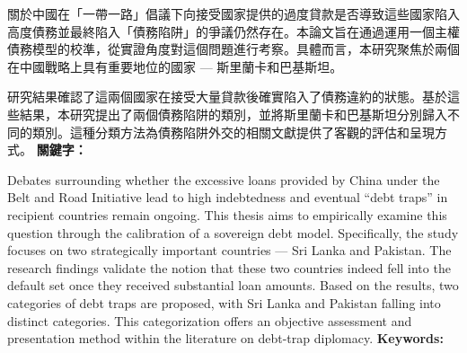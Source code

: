 \begin{abstractzh}
關於中國在「一帶一路」倡議下向接受國家提供的過度貸款是否導致這些國家陷入高度債務並最終陷入「債務陷阱」的爭議仍然存在。本論文旨在通過運用一個主權債務模型的校準，從實證角度對這個問題進行考察。具體而言，本研究聚焦於兩個在中國戰略上具有重要地位的國家 --- 斯里蘭卡和巴基斯坦。

研究結果確認了這兩個國家在接受大量貸款後確實陷入了債務違約的狀態。基於這些結果，本研究提出了兩個債務陷阱的類別，並將斯里蘭卡和巴基斯坦分別歸入不同的類別。這種分類方法為債務陷阱外交的相關文獻提供了客觀的評估和呈現方式。
\bigbreak
\noindent \textbf{關鍵字：}{\, \makeatletter \@keywordszh \makeatother}
\end{abstractzh}

\begin{abstracten}

    Debates surrounding whether the excessive loans provided by China under the Belt and Road Initiative lead to high indebtedness and eventual ``debt traps'' in recipient countries remain ongoing. This thesis aims to empirically examine this question through the calibration of a sovereign debt model. Specifically, the study focuses on two strategically important countries --- Sri Lanka and Pakistan.
    The research findings validate the notion that these two countries indeed fell into the default set once they received substantial loan amounts. Based on the results, two categories of debt traps are proposed, with Sri Lanka and Pakistan falling into distinct categories. This categorization offers an objective assessment and presentation method within the literature on debt-trap diplomacy.
    \bigbreak
\noindent \textbf{Keywords:}{\, \makeatletter \@keywordsen \makeatother}
\end{abstracten}

\begin{comment}
\category{I2.10}{Computing Methodologies}{Artificial Intelligence --
Vision and Scene Understanding} \category{H5.3}{Information
Systems}{Information Interfaces and Presentation (HCI) -- Web-based
Interaction.}

\terms{Design, Human factors, Performance.}

\keywords{Region of interest, Visual attention model, Web-based
games, Benchmarks.}
\end{comment}
